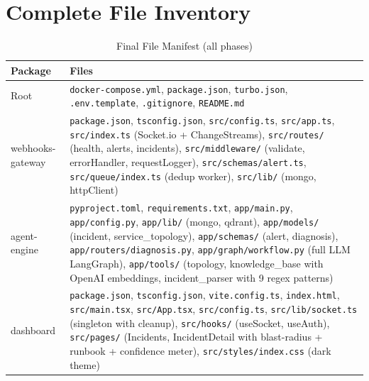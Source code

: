 \documentclass[11pt,a4paper]{article}
\begin{document}
\section{Complete File Inventory}

\begin{table}[h!]
\centering
\caption{Final File Manifest (all phases)}
\renewcommand{\arraystretch}{1.2}
\begin{tabular}{p{5cm} p{7cm}}
\toprule
\textbf{Package} & \textbf{Files} \\
\midrule
Root & \texttt{docker-compose.yml}, \texttt{package.json}, \texttt{turbo.json}, \texttt{.env.template}, \texttt{.gitignore}, \texttt{README.md} \\
\midrule
webhooks-gateway & \texttt{package.json}, \texttt{tsconfig.json}, \texttt{src/config.ts}, \texttt{src/app.ts}, \texttt{src/index.ts} (Socket.io + ChangeStreams), \texttt{src/routes/} (health, alerts, incidents), \texttt{src/middleware/} (validate, errorHandler, requestLogger), \texttt{src/schemas/alert.ts}, \texttt{src/queue/index.ts} (dedup worker), \texttt{src/lib/} (mongo, httpClient) \\
\midrule
agent-engine & \texttt{pyproject.toml}, \texttt{requirements.txt}, \texttt{app/main.py}, \texttt{app/config.py}, \texttt{app/lib/} (mongo, qdrant), \texttt{app/models/} (incident, service\_topology), \texttt{app/schemas/} (alert, diagnosis), \texttt{app/routers/diagnosis.py}, \texttt{app/graph/workflow.py} (full LLM LangGraph), \texttt{app/tools/} (topology, knowledge\_base with OpenAI embeddings, incident\_parser with 9 regex patterns) \\
\midrule
dashboard & \texttt{package.json}, \texttt{tsconfig.json}, \texttt{vite.config.ts}, \texttt{index.html}, \texttt{src/main.tsx}, \texttt{src/App.tsx}, \texttt{src/config.ts}, \texttt{src/lib/socket.ts} (singleton with cleanup), \texttt{src/hooks/} (useSocket, useAuth), \texttt{src/pages/} (Incidents, IncidentDetail with blast-radius + runbook + confidence meter), \texttt{src/styles/index.css} (dark theme) \\
\bottomrule
\end{tabular}
\end{table}

\vspace{16pt}
\begin{center}
\end{center}
\end{document}
